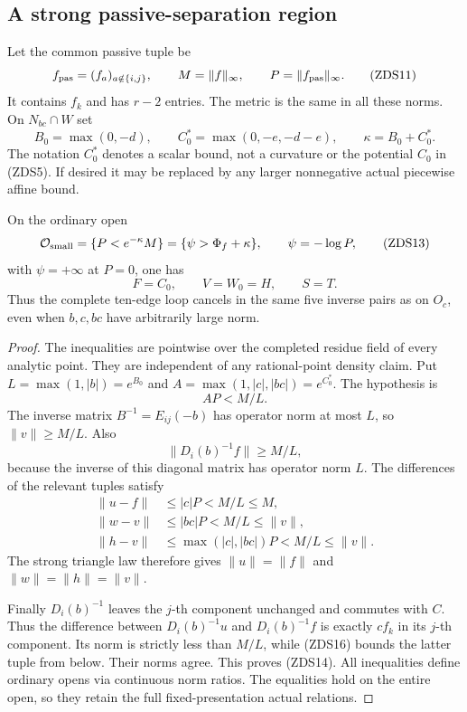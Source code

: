 \subsection{A strong passive-separation region}

Let the common passive tuple be
\[
 f_{\rm pas}=(f_a)_{a\notin\{i,j\}},
 \qquad M=\|f\|_\infty,\qquad P=\|f_{\rm pas}\|_\infty.
 \tag{ZDS11}
\]
It contains $f_k$ and has $r-2$ entries.  The metric is the same
in all these norms.  On $N_{bc}\cap W$ set
\[
 B_0=\max(0,-d),\qquad C_0^*=\max(0,-e,-d-e),\qquad
 \kappa=B_0+C_0^*.
 \tag{ZDS12}
\]
The notation $C_0^*$ denotes a scalar bound, not a curvature or the
potential $C_0$ in (ZDS5).  If desired it may be replaced by any
larger nonnegative actual piecewise affine bound.

\begin{lemma}
On the ordinary open
\[
 \mathcal O_{\rm small}
 =\{P<e^{-\kappa}M\}
 =\{\psi>\Phi_f+\kappa\},\qquad \psi=-\log P,
 \tag{ZDS13}
\]
with $\psi=+\infty$ at $P=0$, one has
\[
 F=C_0,\qquad V=W_0=H,\qquad S=T.
 \tag{ZDS14}
\]
Thus the complete ten-edge loop cancels in the same five inverse
pairs as on $O_c$, even when $b,c,bc$ have arbitrarily large norm.
\end{lemma}

\begin{proof}
The inequalities are pointwise over the completed residue field of
every analytic point.  They are independent of any rational-point
density claim.  Put $L=\max(1,|b|)=e^{B_0}$ and
$A=\max(1,|c|,|bc|)=e^{C_0^*}$.  The hypothesis is
\[
                     AP<M/L.
 \tag{ZDS15}
\]
The inverse matrix $B^{-1}=E_{ij}(-b)$ has operator norm at most
$L$, so $\|v\|\ge M/L$.  Also
\[
 \|D_i(b)^{-1}f\|\ge M/L,
 \tag{ZDS16}
\]
because the inverse of this diagonal matrix has operator norm
$L$.  The differences of the relevant tuples satisfy
\[
 \begin{split}
 \|u-f\|&\le |c|P<M/L\le M,\\
 \|w-v\|&\le |bc|P<M/L\le\|v\|,\\
 \|h-v\|&\le\max(|c|,|bc|)P<M/L\le\|v\|.
 \end{split}
 \tag{ZDS17}
\]
The strong triangle law therefore gives $\|u\|=\|f\|$ and
$\|w\|=\|h\|=\|v\|$.

Finally $D_i(b)^{-1}$ leaves the $j$-th component unchanged and
commutes with $C$.  Thus the difference between
$D_i(b)^{-1}u$ and $D_i(b)^{-1}f$ is exactly $c f_k$ in its
$j$-th component.  Its norm is strictly less than $M/L$, while
(ZDS16) bounds the latter tuple from below.  Their norms agree.
This proves (ZDS14).  All inequalities define ordinary opens via
continuous norm ratios.  The equalities hold on the entire open,
so they retain the full fixed-presentation actual relations.
\end{proof}

